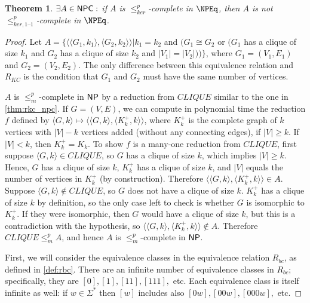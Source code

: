 \documentclass{article}
\newtheorem{theorem}{Theorem}[section]
\theoremstyle{definition} \newtheorem{definition}[definition]{Definition}
\newcommand{\sigmastar}{\Sigma^{*}} %
\newcommand{\kr}{\leq^{p}_{ker}} %
\newcommand{\kri}{\leq^{p}_{ker,1\text{--}1}} %
\newcommand{\mor}{\leq^{p}_{m}} %
\newcommand{\pair}[2]{\langle#1,#2\rangle} %
\begin{document}
\begin{theorem}
  $\exists A\in{\ensuremath{\mathsf{NPC}}}:$ if $A$ is $\kr$-complete in $\NPEq$, then $A$ is not
  $\kri$-complete in $\NPEq$.
\end{theorem}
\begin{proof}
  Let $A=\{\pair{\pair{G_1}{k_1}}{\pair{G_2}{k_2}}| k_1=k_2$ and $(G_1\cong
  G_2$ or $(G_1$ has a clique of size $k_1$ and $G_2$ has a clique of size
  $k_2$ and $|V_1|=|V_2|))\}$, where $G_1=(V_1, E_1)$ and $G_2=(V_2,
  E_2)$. The only difference between this equivalence relation and $R_{KC}$ is
  the condition that $G_1$ and $G_2$ must have the same number of vertices.

  $A$ is $\mor$-complete in ${\mathsf{NP}}$ by a reduction from $CLIQUE$ similar to the
  one in \autoref{thm:rkc_npc}. If $G=(V,E)$, we can compute in polynomial time
  the reduction $f$ defined by
  $\pair{G}{k}\mapsto\pair{\pair{G}{k}}{\pair{K^+_k}{k}}$, where $K^+_k$ is the
  complete graph of $k$ vertices with $|V|-k$ vertices added (without any
  connecting edges), if $|V|\geq k$. If $|V|<k$, then $K^+_k=K_k$. To show $f$
  is a many-one reduction from $CLIQUE$, first suppose $\pair{G}{k}\in CLIQUE$,
  so $G$ has a clique of size $k$, which implies $|V|\geq k$. Hence, $G$ has a
  clique of size $k$, $K^+_k$ has a clique of size $k$, and $|V|$ equals the
  number of vertices in $K^+_k$ (by construction). Therefore
  $\pair{\pair{G}{k}}{\pair{K^+_k}{k}}\in A$. Suppose $\pair{G}{k}\notin
  CLIQUE$, so $G$ does not have a clique of size $k$. $K^+_k$ has a clique of
  size $k$ by definition, so the only case left to check is whether $G$ is
  isomorphic to $K^+_k$. If they were isomorphic, then $G$ would have a clique
  of size $k$, but this is a contradiction with the hypothesis, so
  $\pair{\pair{G}{k}}{\pair{K^+_k}{k}}\notin A$. Therefore $CLIQUE\mor A$, and
  hence $A$ is $\mor$-complete in ${\mathsf{NP}}$.

  First, we will consider the equivalence classes in the equivalence relation
  $R_{bc}$, as defined in \autoref{def:rbc}. There are an infinite number of
  equivalence classes in $R_{bc}$; specifically, they are $[0], [1], [11],
  [111],$ etc. Each equivalence class is itself infinite as well: if
  $w\in\sigmastar$ then $[w]$ includes also $[0w], [00w], [000w],$ etc.



\end{proof}
\end{document}

